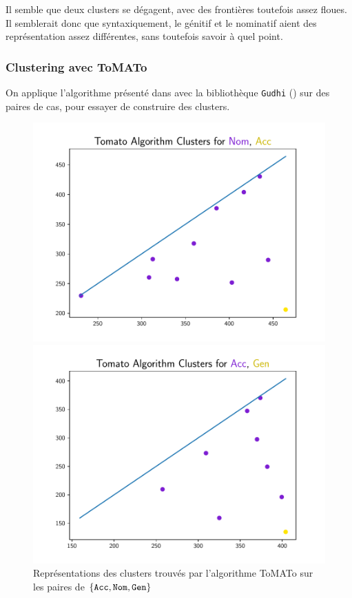\documentclass{cours}
\begin{document}
Il semble que deux clusters se dégagent, avec des frontières toutefois assez floues.
Il semblerait donc que syntaxiquement, le génitif et le nominatif aient des représentation assez différentes, sans toutefois savoir à quel point.

\subsubsection{Clustering avec ToMATo}\label{subsub:tomato}
On applique l'algorithme présenté dans \cite{ToMATo} avec la bibliothèque \texttt{Gudhi} (\cite{Gudhi}) sur des paires de cas, pour essayer de construire des clusters.
\begin{figure}[H]
\begin{minipage}{.5\textwidth}
	\includegraphics[width=\linewidth]{Figures/Visualisations/tomato_Nom_Acc_Nouns}
\end{minipage}
\begin{minipage}{.5\textwidth}
	\includegraphics[width=\linewidth]{Figures/Visualisations/tomato_Acc_Gen_Nouns}
\end{minipage}

\caption{Représentations des clusters trouvés par l'algorithme ToMATo sur les paires de $\{\tt Acc,Nom,Gen\}$}
\end{figure}
\end{document}
